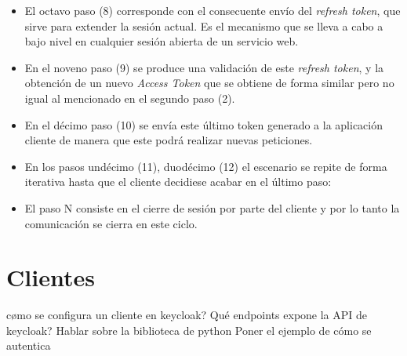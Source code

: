 \begin{itemize}
	\item El octavo paso (8) corresponde con el consecuente envío del \textit{refresh token}, que sirve para extender la sesión actual. Es el mecanismo que se lleva a cabo a bajo nivel en cualquier sesión abierta de un servicio web.
	
	\item En el noveno paso (9) se produce una validación de este \textit{refresh token}, y la obtención de un nuevo \textit{Access Token} que se obtiene de forma similar pero no igual al mencionado en el segundo paso (2). 
	
	\item En el décimo paso (10) se envía este último token generado a la aplicación cliente de manera que este podrá realizar nuevas peticiones. 
	
	\item En los pasos undécimo (11), duodécimo (12) el escenario se repite de forma
	iterativa hasta que el cliente decidiese acabar en el último paso: 
	
	\item El paso N consiste en el cierre de sesión por parte del cliente y por lo tanto la comunicación se cierra en este ciclo. 
	
\end{itemize}


\section*{Clientes}

cømo se configura un cliente en keycloak?
Qué endpoints expone la API de keycloak?
Hablar sobre la biblioteca de python
Poner el ejemplo de cómo se autentica

